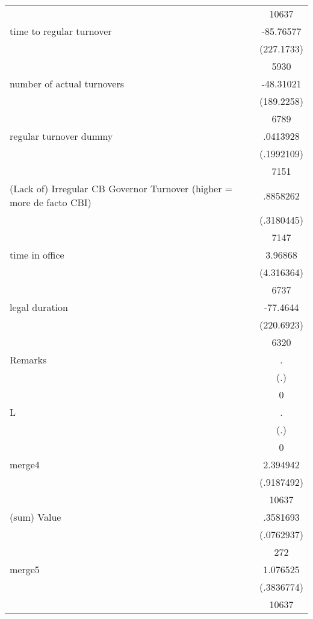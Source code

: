 {\begin{longtable}{l*{1}{c}}
                    &       10637\\
time to regular turnover&   -85.76577\\
                    &  (227.1733)\\
                    &        5930\\
number of actual turnovers&   -48.31021\\
                    &  (189.2258)\\
                    &        6789\\
regular turnover dummy&    .0413928\\
                    &  (.1992109)\\
                    &        7151\\
(Lack of) Irregular CB Governor Turnover (higher = more de facto CBI)&    .8858262\\
                    &  (.3180445)\\
                    &        7147\\
time in office      &     3.96868\\
                    &  (4.316364)\\
                    &        6737\\
legal duration      &    -77.4644\\
                    &  (220.6923)\\
                    &        6320\\
Remarks             &           .\\
                    &         (.)\\
                    &           0\\
L                   &           .\\
                    &         (.)\\
                    &           0\\
merge4              &    2.394942\\
                    &  (.9187492)\\
                    &       10637\\
(sum) Value         &    .3581693\\
                    &  (.0762937)\\
                    &         272\\
merge5              &    1.076525\\
                    &  (.3836774)\\
                    &       10637\\

\end{longtable}}

